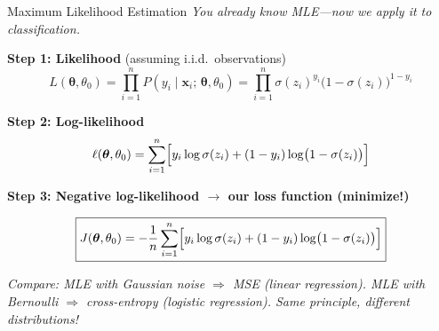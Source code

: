 \documentclass[aspectratio=169,11pt]{beamer}
\begin{document}
\begin{frame}{Maximum Likelihood Estimation}
\textit{You already know MLE---now we apply it to classification.}

\vspace{0.5em}
\textbf{Step 1: Likelihood} (assuming i.i.d.\ observations)
\[
  L(\boldsymbol{\theta},\theta_0) = \prod_{i=1}^{n} P(y_i\mid\boldsymbol{x}_i;\,\boldsymbol{\theta},\theta_0)
               = \prod_{i=1}^{n} \sigma(z_i)^{y_i}\bigl(1-\sigma(z_i)\bigr)^{1-y_i}
\]

\textbf{Step 2: Log-likelihood}
\[
  \ell(\boldsymbol{\theta},\theta_0) = \sum_{i=1}^{n}\Bigl[y_i\log\sigma(z_i) + (1-y_i)\log\bigl(1-\sigma(z_i)\bigr)\Bigr]
\]

\textbf{Step 3: Negative log-likelihood $\to$ our loss function (minimize!)}

\[
  \boxed{J(\boldsymbol{\theta},\theta_0) = -\frac{1}{n}\sum_{i=1}^{n}\Bigl[y_i\log\sigma(z_i) + (1-y_i)\log\bigl(1-\sigma(z_i)\bigr)\Bigr]}
\]

\smallskip
\footnotesize\textit{Compare: MLE with Gaussian noise $\Rightarrow$ MSE (linear regression). MLE with Bernoulli $\Rightarrow$ cross-entropy (logistic regression). Same principle, different distributions!}
\end{frame}
\end{document}
